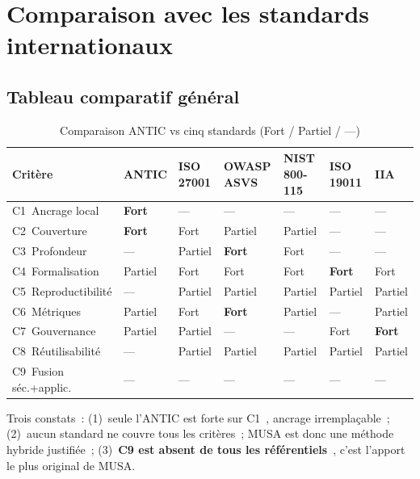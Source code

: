 \documentclass[12pt,a4paper,oneside]{report}
\begin{document}
\section{Comparaison avec les standards internationaux}

\subsection{Tableau comparatif g\'en\'eral}

\begin{table}[H]
\centering\small
\caption{Comparaison ANTIC vs cinq standards (Fort / Partiel / ---)}
\label{tab:comparatif}
\begin{tabularx}{\textwidth}{p{3.5cm}p{1.4cm}p{1.7cm}p{2.1cm}p{2cm}p{1.7cm}p{1.2cm}}
\toprule
\rowcolor{theadcolor}
\color{white}\textbf{Crit\`ere} &
\color{white}\textbf{ANTIC} &
\color{white}\textbf{ISO 27001} &
\color{white}\textbf{OWASP ASVS} &
\color{white}\textbf{NIST 800-115} &
\color{white}\textbf{ISO 19011} &
\color{white}\textbf{IIA} \\
\midrule
C1~Ancrage local & \textbf{Fort} & --- & --- & --- & --- & --- \\
C2~Couverture & \textbf{Fort} & Fort & Partiel & Partiel & --- & --- \\
C3~Profondeur & --- & Partiel & \textbf{Fort} & Fort & --- & --- \\
C4~Formalisation & Partiel & Fort & Fort & Fort & \textbf{Fort} & Fort \\
C5~Reproductibilit\'e & --- & Partiel & Partiel & Partiel & Partiel & Partiel \\
C6~M\'etriques & Partiel & Fort & \textbf{Fort} & Partiel & --- & Partiel \\
C7~Gouvernance & Partiel & Partiel & --- & --- & Fort & \textbf{Fort} \\
C8~R\'eutilisabilit\'e & --- & Partiel & Partiel & Partiel & Partiel & Partiel \\
C9~Fusion s\'ec.+applic. & --- & --- & --- & --- & --- & --- \\
\bottomrule
\end{tabularx}
\end{table}

\noindent Trois constats~: (1)~seule l'ANTIC est forte sur C1~, ancrage
irremplaçable~; (2)~aucun standard ne couvre tous les crit\`eres~; MUSA est
donc une m\'ethode hybride justifi\'ee~; (3)~\textbf{C9 est absent de tous les
r\'ef\'erentiels}~, c'est l'apport le plus original de MUSA.
\end{document}
